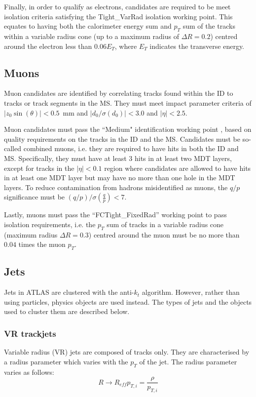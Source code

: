 \documentclass[10pt,a4paper]{book}
\begin{document}
Finally, in order to qualify as electrons, candidates are required to be meet isolation criteria satisfying the Tight\_VarRad isolation working point. This equates to having both the calorimeter energy sum and $p_T$ sum of the tracks within a variable radius cone (up to a maximum radius of $\Delta R = 0.2$) centred around the electron less than $0.06 E_T$, where $E_T$ indicates the transverse energy. 

\subsection{Muons}
Muon candidates are identified by correlating tracks found within the ID to tracks or track segments in the MS. They must meet impact parameter criteria of $\vert z_0\sin(\theta)\vert < 0.5$~mm and $\vert d_0/\sigma(d_0)\vert < 3.0$ and $\vert \eta \vert < 2.5$. 

Muon candidates must pass the ``Medium" identification working point \cite{ATLAS:2016lqx}, based on quality requirements on the tracks in the ID and the MS. Candidates must be so-called combined muons, i.e. they are required to have hits in both the ID and MS. Specifically, they must have at least 3 hits in at least two MDT layers, except for tracks in the  $\vert \eta \vert < 0.1$ region where candidates are allowed to have hits in at least one MDT layer but may have no more than one hole in the MDT layers. To reduce contamination from hadrons misidentified as muons, the $q/p$ significance must be $(q/p)/\sigma(\frac{q}{p}) < 7$. 

Lastly, muons must pass the ``FCTight\_FixedRad” working point to pass isolation requirements, i.e. the $p_T$ sum of tracks in a variable radius cone (maximum radius $\Delta R = 0.3$) centred around the muon must be no more than $0.04$ times the muon $p_T$.

\subsection{Jets}
Jets in ATLAS are clustered with the anti-$k_t$ algorithm. However, rather than using particles, physics objects are used instead. The types of jets and the objects used to cluster them are described below.

\subsubsection{VR trackjets}

Variable radius (VR) jets are composed of tracks only. They are characterised by a radius parameter which varies with the $p_T$ of the jet. The radius parameter varies as follows:
\begin{equation}
R \rightarrow R_{eff}{p_{T,i}} = \frac{\rho}{p_{T,i}}
\label{Reff}
\end{equation} 
\end{document}
